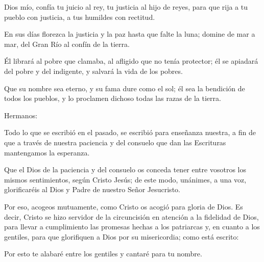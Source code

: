  


\begin{psbody}
	Dios mío, confía tu juicio al rey,
	tu justicia al hijo de reyes,
	para que rija a tu pueblo con justicia,
	a tus humildes con rectitud.
	
	En sus días florezca la justicia
	y la paz hasta que falte la luna;
	domine de mar a mar,
	del Gran Río al confín de la tierra.
	
	Él librará al pobre que clamaba,
	al afligido que no tenía protector;
	él se apiadará del pobre y del indigente,
	y salvará la vida de los pobres. 
	
	Que su nombre sea eterno, 
	y su fama dure como el sol; 
	él sea la bendición de todos los pueblos, 
	y lo proclamen dichoso todas las razas de la tierra.
\end{psbody}


 


\begin{scripture}
	Hermanos: 
	
	Todo lo que se escribió en el pasado, se escribió para enseñanza
	nuestra, a fin de que a través de nuestra paciencia y del consuelo que
	dan las Escrituras mantengamos la esperanza. 
	
	Que el Dios de la paciencia y del consuelo os conceda tener entre
	vosotros los mismos sentimientos, según Cristo Jesús; de este modo,
	unánimes, a una voz, glorificaréis al Dios y Padre de nuestro Señor
	Jesucristo. 
	
	Por eso, acogeos mutuamente, como Cristo os acogió para gloria de Dios.
	Es decir, Cristo se hizo servidor de la circuncisión en atención a la
	fidelidad de Dios, para llevar a cumplimiento las promesas hechas a los
	patriarcas y, en cuanto a los gentiles, para que glorifiquen a Dios por
	su misericordia; como está escrito: 
	
	Por esto te alabaré entre los gentiles y cantaré para tu nombre.
\end{scripture}


 

